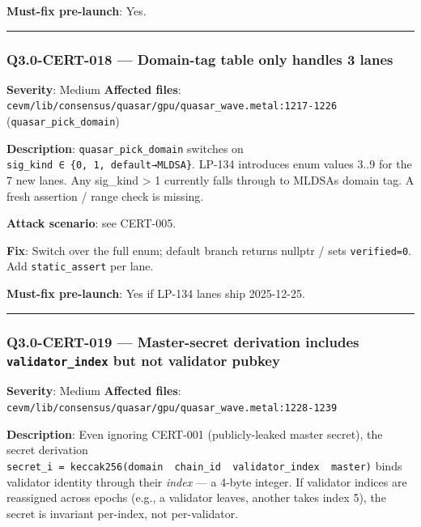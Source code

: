 \documentclass[
]{article}
\begin{document}
\textbf{Must-fix pre-launch}: Yes.

\begin{center}\rule{0.5\linewidth}{0.5pt}\end{center}

\subsubsection{Q3.0-CERT-018 --- Domain-tag table only handles 3
lanes}\label{q30-cert-018--domain-tag-table-only-handles-3-lanes}

\textbf{Severity}: Medium \textbf{Affected files}:
\texttt{cevm/lib/consensus/quasar/gpu/quasar\_wave.metal:1217-1226}
(\texttt{quasar\_pick\_domain})

\textbf{Description}: \texttt{quasar\_pick\_domain} switches on
\texttt{sig\_kind\ ∈\ \{0,\ 1,\ default→MLDSA\}}. LP-134 introduces enum
values 3..9 for the 7 new lanes. Any sig\_kind \textgreater{} 1
currently falls through to MLDSA\textquotesingle s domain tag. A fresh
assertion / range check is missing.

\textbf{Attack scenario}: see CERT-005.

\textbf{Fix}: Switch over the full enum; default branch returns nullptr
/ sets \texttt{verified=0}. Add \texttt{static\_assert} per lane.

\textbf{Must-fix pre-launch}: Yes if LP-134 lanes ship 2025-12-25.

\begin{center}\rule{0.5\linewidth}{0.5pt}\end{center}

\subsubsection{\texorpdfstring{Q3.0-CERT-019 --- Master-secret
derivation includes \texttt{validator\_index} but not validator
pubkey}{Q3.0-CERT-019 --- Master-secret derivation includes validator\_index but not validator pubkey}}\label{q30-cert-019--master-secret-derivation-includes-validator_index-but-not-validator-pubkey}

\textbf{Severity}: Medium \textbf{Affected files}:
\texttt{cevm/lib/consensus/quasar/gpu/quasar\_wave.metal:1228-1239}

\textbf{Description}: Even ignoring CERT-001 (publicly-leaked master
secret), the secret derivation
\texttt{secret\_i\ =\ keccak256(domain\ \textbar{}\textbar{}\ chain\_id\ \textbar{}\textbar{}\ validator\_index\ \textbar{}\textbar{}\ master)}
binds validator identity through their \emph{index} --- a 4-byte
integer. If validator indices are reassigned across epochs (e.g., a
validator leaves, another takes index 5), the secret is invariant
per-index, not per-validator.
\end{document}
